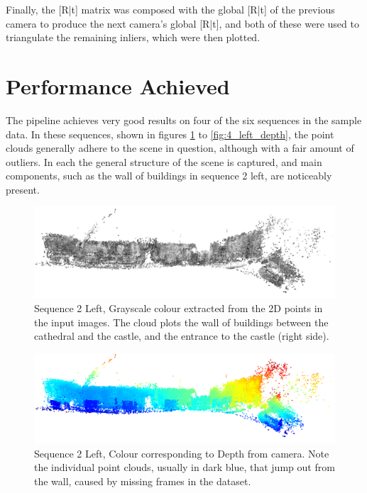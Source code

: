 \documentclass[11pt]{article}
\begin{document}
Finally, the [R|t] matrix was composed with the global [R|t] of the previous camera to produce the next camera's global [R|t], and both of these were used to triangulate the remaining inliers, which were then plotted.

\section*{Performance Achieved}
The pipeline achieves very good results on four of the six sequences in the sample data. In these sequences, shown in figures \ref{fig:2_left_gray} to \ref{fig:4_left_depth}, the point clouds generally adhere to the scene in question, although with a fair amount of outliers. In each the general structure of the scene is captured, and main components, such as the wall of buildings in sequence 2 left, are noticeably present.

\begin{figure}[h]
	\centering
	\includegraphics[scale=0.65]{Sequence2Left_Grayscale}
	\caption{Sequence 2 Left, Grayscale colour extracted from the 2D points in the input images. The cloud plots the wall of buildings between the cathedral and the castle, and the entrance to the castle (right side).}
	\label{fig:2_left_gray}
\end{figure}
\begin{figure}[h]
	\centering
	\includegraphics[scale=0.65]{Sequence2Left_Depth}
	\caption{Sequence 2 Left, Colour corresponding to Depth from camera. Note the individual point clouds, usually in dark blue, that jump out from the wall, caused by missing frames in the dataset.}
	\label{fig:2_left_depth}
\end{figure}
\end{document}
